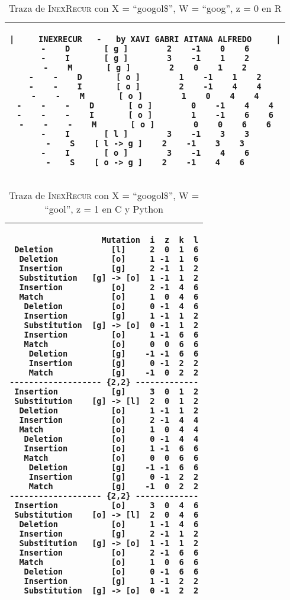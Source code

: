 \documentclass{article}
\newcommand{\tempcaption}{}
\newenvironment{code}[4]{
\begin{table}[h!]
\gdef\tempcaption{Traza de \textsc{InexRecur} con X = ``#1'', W = ``#2'', z = #3 en #4}
\centering
\begin{tabular}{|c|}
\hline }
{\\\hline
\end{tabular}
\caption{\tempcaption}
\end{table} }
\newcommand{\C}{C }
\newcommand{\R}{R }
\newcommand{\python}{Python }
\begin{document}
\vfill
\begin{code}{googol\$}{goog}{0}{\R}
\begin{lstlisting}
|     INEXRECUR   -   by XAVI GABRI AITANA ALFREDO     |
-    D       [ g ]        2    -1    0    6
-    I       [ g ]        3    -1    1    2
-    M       [ g ]        2    0    1    2
-    -    D       [ o ]        1    -1    1    2
-    -    I       [ o ]        2    -1    4    4
-    -    M       [ o ]        1    0    4    4
-    -    -    D       [ o ]        0    -1    4    4
-    -    -    I       [ o ]        1    -1    6    6
-    -    -    M       [ o ]        0    0    6    6
-    I       [ l ]        3    -1    3    3
-    S    [ l -> g ]    2    -1    3    3
-    I       [ o ]        3    -1    4    6
-    S    [ o -> g ]    2    -1    4    6
\end{lstlisting}
\end{code}
\vfill
\clearpage
\phantom{}
\vfill
\begin{code}{googol\$}{gool}{1}{\C y \python}
\begin{lstlisting}
                   Mutation  i  z  k  l
 Deletion            [l]     2  0  1  6
  Deletion           [o]     1 -1  1  6
  Insertion          [g]     2 -1  1  2
  Substitution   [g] -> [o]  1 -1  1  2
  Insertion          [o]     2 -1  4  6
  Match              [o]     1  0  4  6
   Deletion          [o]     0 -1  4  6
   Insertion         [g]     1 -1  1  2
   Substitution  [g] -> [o]  0 -1  1  2
   Insertion         [o]     1 -1  6  6
   Match             [o]     0  0  6  6
    Deletion         [g]    -1 -1  6  6
    Insertion        [g]     0 -1  2  2
    Match            [g]    -1  0  2  2
------------------- {2,2} -------------
 Insertion           [g]     3  0  1  2
 Substitution    [g] -> [l]  2  0  1  2
  Deletion           [o]     1 -1  1  2
  Insertion          [o]     2 -1  4  4
  Match              [o]     1  0  4  4
   Deletion          [o]     0 -1  4  4
   Insertion         [o]     1 -1  6  6
   Match             [o]     0  0  6  6
    Deletion         [g]    -1 -1  6  6
    Insertion        [g]     0 -1  2  2
    Match            [g]    -1  0  2  2
------------------- {2,2} -------------
 Insertion           [o]     3  0  4  6
 Substitution    [o] -> [l]  2  0  4  6
  Deletion           [o]     1 -1  4  6
  Insertion          [g]     2 -1  1  2
  Substitution   [g] -> [o]  1 -1  1  2
  Insertion          [o]     2 -1  6  6
  Match              [o]     1  0  6  6
   Deletion          [o]     0 -1  6  6
   Insertion         [g]     1 -1  2  2
   Substitution  [g] -> [o]  0 -1  2  2
\end{lstlisting}
\end{code}
\end{document}
